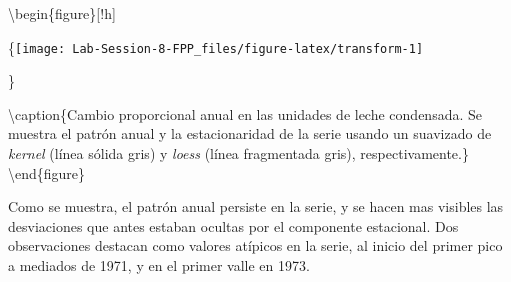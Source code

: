 \documentclass[]{article}
\newenvironment{Shaded}{\begin{snugshade}}{\end{snugshade}}
\newcommand{\DataTypeTok}[1]{\textcolor[rgb]{0.13,0.29,0.53}{#1}}
\newcommand{\DecValTok}[1]{\textcolor[rgb]{0.00,0.00,0.81}{#1}}
\newcommand{\KeywordTok}[1]{\textcolor[rgb]{0.13,0.29,0.53}{\textbf{#1}}}
\newcommand{\NormalTok}[1]{#1}
\newcommand{\OperatorTok}[1]{\textcolor[rgb]{0.81,0.36,0.00}{\textbf{#1}}}
\newcommand{\OtherTok}[1]{\textcolor[rgb]{0.56,0.35,0.01}{#1}}
\newcommand{\StringTok}[1]{\textcolor[rgb]{0.31,0.60,0.02}{#1}}
\begin{document}
\begin{Shaded}
\end{Shaded}

\textbackslash{}begin\{figure\}{[}!h{]}

\{\centering \texttt{[image: Lab-Session-8-FPP\_files/figure-latex/transform-1]}

\}

\textbackslash{}caption\{Cambio proporcional anual en las unidades de leche condensada. Se muestra el patrón anual y la estacionaridad de la serie usando un suavizado de \emph{kernel} (línea sólida gris) y \emph{loess} (línea fragmentada gris), respectivamente.\}\label{fig:transform}
\textbackslash{}end\{figure\}

Como se muestra, el patrón anual persiste en la serie, y se hacen mas visibles las desviaciones que antes estaban ocultas por el componente estacional. Dos observaciones destacan como valores atípicos en la serie, al inicio del primer pico a mediados de 1971, y en el primer valle en 1973.
\end{document}
